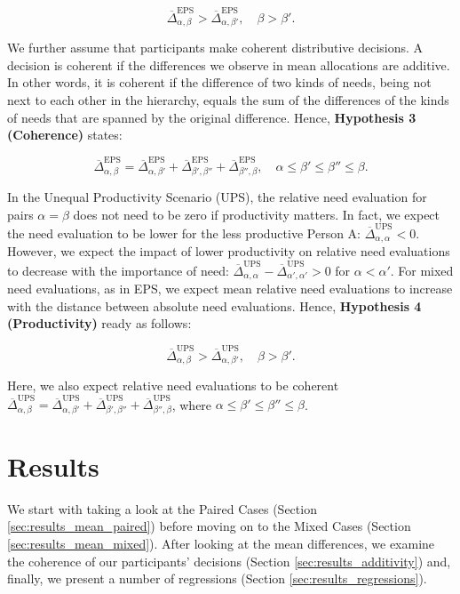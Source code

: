 \documentclass[egregdoesnotlikesansseriftitles]{scrartcl}
\begin{document}
\begin{equation}
   \overline{\Delta}^\text{EPS}_{\alpha,\beta}>\overline{\Delta}^\text{EPS}_{\alpha,\beta'},\quad\beta>\beta'.
\end{equation}

\noindent We further assume that participants make coherent distributive decisions.
A decision is coherent if the differences we observe in mean allocations are additive.
In other words, it is coherent if the difference of two kinds of needs, being not next to each other in the hierarchy, equals the sum of the differences of the kinds of needs that are spanned by the original difference.
Hence, \textbf{Hypothesis 3 (Coherence)} states:

\begin{equation}
   \overline{\Delta}^\text{EPS}_{\alpha,\beta}=\overline{\Delta}^\text{EPS}_{\alpha,\beta'}+\overline{\Delta}^\text{EPS}_{\beta',\beta''}+\overline{\Delta}^\text{EPS}_{\beta'',\beta},\quad\alpha\le\beta'\le\beta''\le\beta.
\end{equation}

\noindent In the Unequal Productivity Scenario (UPS), the relative need evaluation for pairs $\alpha=\beta$ does not need to be zero if productivity matters.
In fact, we expect the need evaluation to be lower for the less productive Person A: $\overline{\Delta}^\text{UPS}_{\alpha,\alpha}<0$.
However, we expect the impact of lower productivity on relative need evaluations to decrease with the importance of need: $\overline{\Delta}^\text{UPS}_{\alpha,\alpha}-\overline{\Delta}^\text{UPS}_{\alpha',\alpha'}>0$ for $\alpha<\alpha'$.
For mixed need evaluations, as in EPS, we expect mean relative need evaluations to increase with the distance between absolute need evaluations.
Hence, \textbf{Hypothesis 4 (Productivity)} ready as follows:

\begin{equation}
   \overline{\Delta}^\text{UPS}_{\alpha,\beta}>\overline{\Delta}^\text{UPS}_{\alpha,\beta'},\quad\beta>\beta'.
\end{equation}

\noindent Here, we also expect relative need evaluations to be coherent $\overline{\Delta}^\text{UPS}_{\alpha,\beta}=\overline{\Delta}^\text{UPS}_{\alpha,\beta'}+\overline{\Delta}^\text{UPS}_{\beta',\beta''}+\overline{\Delta}^\text{UPS}_{\beta'',\beta}$, where $\alpha\le\beta'\le\beta''\le\beta$.


\section{Results}\label{sec:results}
We start with taking a look at the Paired Cases (Section \ref{sec:results_mean_paired}) before moving on to the Mixed Cases (Section \ref{sec:results_mean_mixed}).
After looking at the mean differences, we examine the coherence of our participants' decisions (Section \ref{sec:results_additivity}) and, finally, we present a number of regressions (Section \ref{sec:results_regressions}).
\end{document}
